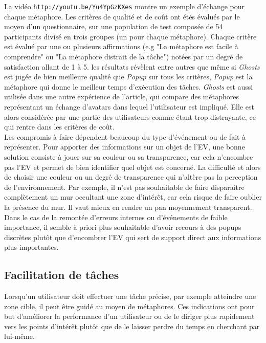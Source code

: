 \documentclass[11pt]{article}
\begin{document}
La vidéo \texttt{http://youtu.be/Yu4YpGzKXes} montre un exemple d'échange pour chaque métaphore. Les critères de qualité et de coût ont étés évalués par le moyen d'un questionnaire, sur une population de test composée de 54 participants divisé en trois groupes (un pour chaque métaphore). Chaque critère est évalué par une ou plusieurs affirmations (e.g "La métaphore est facile à comprendre" ou "La métaphore distrait de la tâche") notées par un degré de satisfaction allant de 1 à 5. les résultats révèlent entre autres que même si \textit{Ghosts} est jugée de bien meilleure qualité que \textit{Popup} sur tous les critères, \textit{Popup} est la métaphore qui donne le meilleur temps d'exécution des tâches. \textit{Ghosts} est aussi utilisée dans une autre expérience de l'article, qui compare des métaphores représentant un échange d'avatars dans lequel l'utilisateur est impliqué. Elle est alors considérée par une partie des utilisateurs comme étant trop distrayante, ce qui rentre dans les critères de coût.
\\

Les compromis à faire dépendent beaucoup du type d'événement ou de fait à représenter. Pour apporter des informations sur un objet de l'EV, une bonne solution consiste à jouer sur sa couleur ou sa transparence, car cela n'encombre pas l'EV et permet de bien identifier quel objet est concerné. La difficulté et alors de choisir une couleur ou un degré de transparence qui n'altère pas la perception de l'environnement. Par exemple, il n'est pas souhaitable de faire disparaître complètement un mur occultant une zone d'intérêt, car cela risque de faire oublier la présence du mur. Il vaut mieux en rendre un pan moyennement transparent. Dans le cas de la remontée d'erreurs internes ou d'événements de faible importance, il semble à priori plus souhaitable d'avoir recours à des popups discrètes plutôt que d'encombrer l'EV qui sert de support direct aux informations plus importantes.

\subsection{Facilitation de tâches}
\label{subsec:facilitation}
Lorsqu'un utilisateur doit effectuer une tâche précise, par exemple atteindre une zone cible, il peut être guidé au moyen de métaphores. Ces indications ont pour but d'améliorer la performance d'un utilisateur ou de le diriger plus rapidement vers les points d'intérêt plutôt que de le laisser perdre du temps en cherchant par lui-même.
\\
\end{document}
